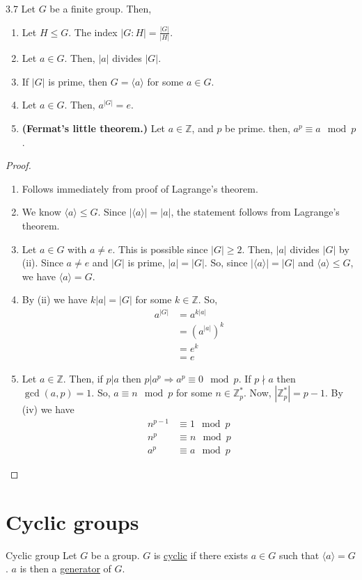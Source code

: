 \documentclass[12pt]{article}
\newcommand{\Z}{\mathbb{Z}}
\begin{document}
	\begin{mycor}{}{3.7}
		Let $G$ be a finite group. Then,
		\begin{enumerate}[label=(\roman*)]
			\item Let $H\leq G$. The index $|G:H|=\frac{|G|}{|H|}$.
			\item Let $a\in G$. Then, $|a|$ divides $|G|$.
			\item If $|G|$ is prime, then $G=\langle a\rangle$ for some $a\in G$.
			\item Let $a\in G$. Then, $a^{|G|}=e$.
			\item  \textbf{(Fermat's little theorem.)} Let $a\in\Z$, and $p$ be prime. then, $a^p\equiv a\mod p$.
		\end{enumerate}
		\begin{proof}~
			\begin{enumerate}[label=(\roman*)]
				\item Follows immediately from proof of Lagrange's theorem.
				\item We know $\langle a\rangle\leq G$. Since $|\langle a\rangle|=|a|$, the statement follows from Lagrange's theorem.
				\item Let $a\in G$ with $a\neq e$. This is possible since $|G|\geq2$. Then, $|a|$ divides $|G|$ by (ii). Since $a\neq e$ and $|G|$ is prime, $|a|=|G|$. So, since $|\langle a\rangle|=|G|$ and $\langle a\rangle\leq G$, we have $\langle a\rangle=G$.
				\item By (ii) we have $k|a|=|G|$ for some $k\in\Z$. So,
				\begin{align*}
					a^{|G|}&=a^{k|a|}\\
					&=(a^{|a|})^k\\
					&=e^k\\
					&=e
				\end{align*}
				\item Let $a\in\Z$. Then, if $p|a$ then $p|a^p\Longrightarrow a^p\equiv0\mod p$. If $p\nmid a$ then $\gcd(a, p)=1$. So, $a\equiv n\mod p$ for some $n\in\Z_p^*$. Now, $|\Z_p^*|=p-1$. By (iv) we have
				\begin{align*}
					n^{p-1}&\equiv1\mod p\\
					n^p&\equiv n\mod p\\
					a^p&\equiv a\mod p
				\end{align*}
			\end{enumerate}
		\end{proof}
	\end{mycor}
	
	\section{Cyclic groups}
	\begin{mydef}{Cyclic group}{}
		Let $G$ be a group. $G$ is \underline{cyclic} if there exists $a\in G$ such that $\langle a\rangle=G$. $a$ is then a \underline{generator} of $G$.
	\end{mydef}
	
\end{document}
